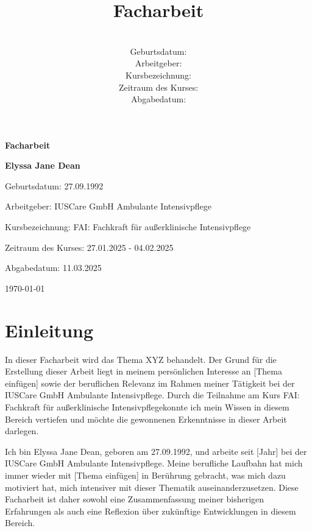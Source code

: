 \documentclass[a4paper,12pt]{article}
\title{\textbf{Facharbeit}}
\author{
    \autor \\
    Geburtsdatum: \geburtsdatum \\
    Arbeitgeber: \arbeitgeber \\
    Kursbezeichnung: \kursbezeichnung \\
    Zeitraum des Kurses: \kurszeitraum \\
    Abgabedatum: \abgabedatum
}
\date{}
\newcommand{\autor}{Elyssa Jane Dean}
\newcommand{\geburtsdatum}{27.09.1992}
\newcommand{\arbeitgeber}{IUSCare GmbH Ambulante Intensivpflege}
\newcommand{\kursbezeichnung}{FAI: Fachkraft für außerklinische Intensivpflege}
\newcommand{\kurszeitraum}{27.01.2025 - 04.02.2025}
\newcommand{\abgabedatum}{11.03.2025}
\begin{document}
\begin{titlepage}
	\centering
	\vspace*{2cm}
	\vspace{1cm}

	{\Huge \textbf{Facharbeit} \par}
	\vspace{1.5cm}

	{\Large \textbf{\autor} \par}
	\vspace{0.5cm}

	{\large Geburtsdatum: \geburtsdatum \par}
	\vspace{0.5cm}

	{\large Arbeitgeber: \arbeitgeber \par}
	\vspace{0.5cm}

	{\large Kursbezeichnung: \kursbezeichnung \par}
	\vspace{0.5cm}

	{\large Zeitraum des Kurses: \kurszeitraum \par}
	\vspace{0.5cm}

	{\large Abgabedatum: \abgabedatum \par}
	\vspace{2cm}

	\vfill
	{\large \today \par}
\end{titlepage}

\tableofcontents
\newpage

\section{Einleitung}
In dieser Facharbeit wird das Thema XYZ behandelt. Der Grund für die
Erstellung dieser Arbeit liegt in meinem persönlichen Interesse an
	[Thema einfügen] sowie der beruflichen Relevanz im Rahmen meiner
Tätigkeit bei der \arbeitgeber. Durch die Teilnahme am Kurs
\kursbezeichnung konnte ich mein Wissen in diesem Bereich vertiefen
und möchte die gewonnenen Erkenntnisse in dieser Arbeit darlegen.

Ich bin \autor, geboren am \geburtsdatum, und arbeite seit [Jahr]
bei der \arbeitgeber. Meine berufliche Laufbahn hat mich immer wieder
mit [Thema einfügen] in Berührung gebracht, was mich dazu motiviert
hat, mich intensiver mit dieser Thematik auseinanderzusetzen.
Diese Facharbeit ist daher sowohl eine Zusammenfassung meiner
bisherigen Erfahrungen als auch eine Reflexion über zukünftige
Entwicklungen in diesem Bereich.
\end{document}
